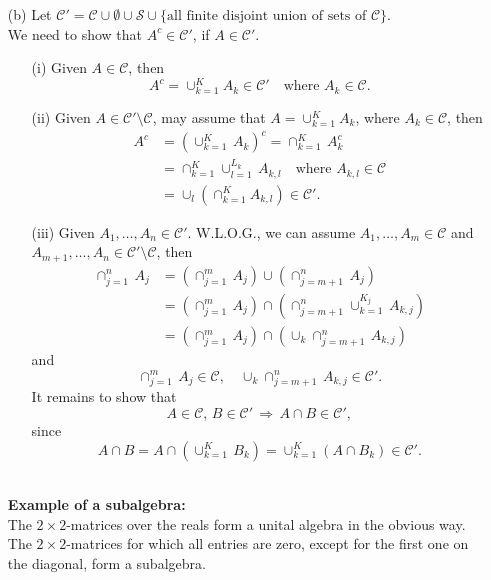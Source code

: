 \documentclass[a4paper,11pt]{article}
\begin{document}
\begin{enumerate}
		\item [(b)]
			Let $\mathscr{C}' = \mathscr{C} \cup \emptyset \cup \mathscr{S} \cup \{\text{all finite disjoint union of sets of }\mathscr{C}\}$.\\
			We need to show that $A^c \in \mathscr{C}'$, if $A \in \mathscr{C}'$.
			\begin{enumerate}
				\item [(i)]
					Given $A \in \mathscr{C}$, then 
						$$A^c
						= \cup_{k=1}^K A_k \in \mathscr{C}'
						\quad \text{where } A_k \in \mathscr{C}.$$
				\item [(ii)]
					Given $A \in \mathscr{C}' \setminus \mathscr{C}$, may assume that $A = \cup_{k=1}^K A_k$, where $A_k \in \mathscr{C}$, then
						$$\begin{aligned}
						A^c
						&= \left( \cup_{k=1}^K\,A_k \right)^c
						= \cap_{k=1}^K\,A_k^c\\
						&= \cap_{k=1}^K \cup_{l=1}^{L_k}\,A_{k,l}
						\quad \text{where } A_{k,l} \in \mathscr{C}\\
						&= \cup_l \left( \cap_{k = 1}^K A_{k,l} \right) \in \mathscr{C}'.
						\end{aligned}$$
				\item [(iii)]
					Given $A_1,\dots,A_n \in \mathscr{C}'$. W.L.O.G., we can assume $A_1,\dots,A_m \in \mathscr{C}$ and $A_{m+1},\dots,A_n \in \mathscr{C}' \setminus \mathscr{C}$, then
						$$\begin{aligned}
						\cap_{j = 1}^n\,A_j
						&= (\cap_{j=1}^m\,A_j) \cup (\cap_{j = m+1}^n\,A_j)\\
						&= (\cap_{j=1}^m\,A_j) \cap (\cap_{j=m+1}^n \cup_{k=1}^{K_j}\,A_{k,j})\\
						&= (\cap_{j=1}^m\,A_j) \cap (\cup_k \cap_{j=m+1}^n\,A_{k,j})
						\end{aligned}$$
					and
						$$\cap_{j=1}^m\,A_j \in \mathscr{C}
						,\quad
						\cup_k \cap_{j=m+1}^n\,A_{k,j} \in \mathscr{C}'.$$
					It remains to show that
						$$A \in \mathscr{C}
						,\,B \in \mathscr{C}'
						\,\Rightarrow\,
						A \cap B \in \mathscr{C}',$$
					since
						$$A \cap B
						= A \cap(\cup_{k=1}^K\,B_k)
						= \cup_{k=1}^K (A \cap B_k)
						\in \mathscr{C}'.$$\
			\end{enumerate}


			\textbf{Example of a subalgebra: }\\
			The $2\times2$-matrices over the reals form a unital algebra in the obvious way.\\
			The $2\times2$-matrices for which all entries are zero, except for the first one on the diagonal, form a subalgebra.

	\end{enumerate}
\end{document}
